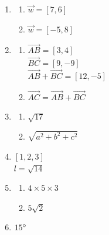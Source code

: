 \documentclass{article}
\begin{document}
\begin{enumerate}
\begin{enumerate}
	\end{enumerate}
	
\item 

	\begin{enumerate}
	
	\item $\vec{w} = [7, 6]$
	
	\item $\vec{w} = [-5, 8]$
	
	\end{enumerate}
	
\item

	\begin{enumerate}
	
	\item $\overrightarrow{AB} = [3, 4]$ \\
		$\overrightarrow{BC} = [9, -9]$ \\
		$\overrightarrow{AB} + \overrightarrow{BC} = [12, -5]$
	
	\item $\overrightarrow{AC} = \overrightarrow{AB} + \overrightarrow{BC}$
	
	\end{enumerate}
	
\item

	\begin{enumerate}
	
	\item $\sqrt{17}$
	
	\item $\sqrt{a^2 + b^2 + c^2}$
	
	\end{enumerate}
	
\item $[1, 2, 3]$ \\
	$l = \sqrt{14}$

\item
	
	\begin{enumerate}
	
	\item $4 \times 5 \times 3$
	
	\item $5\sqrt{2}$
	
	\end{enumerate}
	
\item $15 \degree$


\end{enumerate}
\end{document}
